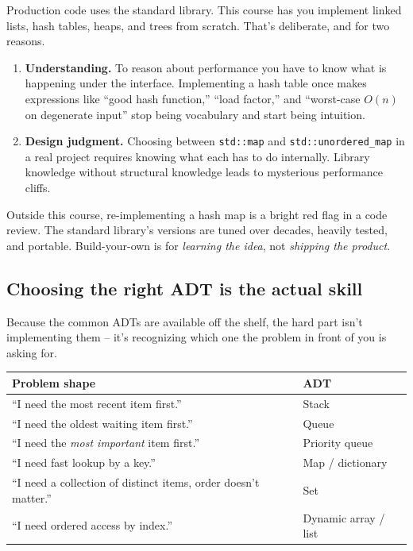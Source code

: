 \documentclass[11pt]{article}
\begin{document}
Production code uses the standard library. This course has you
implement linked lists, hash tables, heaps, and trees from scratch.
That's deliberate, and for two reasons.

\begin{ideabox}
\begin{enumerate}[leftmargin=*]
  \item \textbf{Understanding.} To reason about performance you have
        to know what is happening under the interface. Implementing
        a hash table once makes expressions like ``good hash
        function,'' ``load factor,'' and ``worst-case $O(n)$ on
        degenerate input'' stop being vocabulary and start being
        intuition.
  \item \textbf{Design judgment.} Choosing between
        \texttt{std::map} and \texttt{std::unordered\_map} in a real
        project requires knowing what each has to do internally.
        Library knowledge without structural knowledge leads to
        mysterious performance cliffs.
\end{enumerate}
\end{ideabox}

\begin{warnbox}
Outside this course, re-implementing a hash map is a bright red flag
in a code review. The standard library's versions are tuned over
decades, heavily tested, and portable. Build-your-own is for
\emph{learning the idea}, not \emph{shipping the product}.
\end{warnbox}

\subsection{Choosing the right ADT is the actual skill}

Because the common ADTs are available off the shelf, the hard part
isn't implementing them -- it's recognizing which one the problem
in front of you is asking for.

\begin{center}
\footnotesize
\renewcommand{\arraystretch}{1.25}
\begin{tabular}{@{}p{6.2cm}p{5.2cm}@{}}
\hline
\textbf{Problem shape} & \textbf{ADT} \\
\hline
``I need the most recent item first.''          & Stack \\
``I need the oldest waiting item first.''       & Queue \\
``I need the \emph{most important} item first.'' & Priority queue \\
``I need fast lookup by a key.''                 & Map / dictionary \\
``I need a collection of distinct items, order doesn't matter.'' & Set \\
``I need ordered access by index.''              & Dynamic array / list \\
\hline
\end{tabular}
\end{center}
\end{document}
